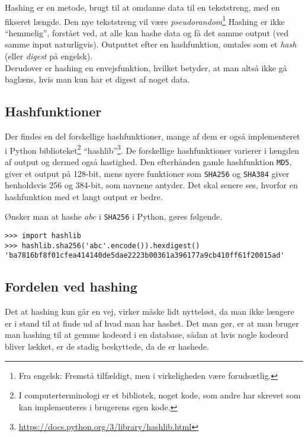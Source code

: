 Hashing er en metode, brugt til at omdanne data til en tekststreng, med en fikseret længde.
Den nye tekststreng vil være \emph{pseudorandom}\footnote{Fra engelsk: Fremstå tilfældigt, men i virkeligheden være forudsætlig.} %
Hashing er ikke ``hemmelig'', forstået ved, at alle kan hashe data og få det samme output (ved samme input naturligvis).
Outputtet efter en hashfunktion, omtales som et \emph{hash} (eller \emph{digest} på engelsk).
\\
Derudover er hashing en envejsfunktion, hvilket betyder, at man altså ikke gå baglæns, hvis man kun har et digest af noget data.\cite{algoritmer}


\subsection{Hashfunktioner}
Der findes en del forskellige hashfunktioner, mange af dem er også implementeret i Python biblioteket\footnote{I computerterminologi er et bibliotek, noget kode, som andre har skrevet som kan implementeres i brugerens egen kode.} ``hashlib''\footnote{\url{https://docs.python.org/3/library/hashlib.html}}.
De forskellige hashfunktioner varierer i længden af output og dermed også hastighed.
Den efterhånden gamle hashfunktion \texttt{MD5}, giver et output på 128-bit, mens nyere funktioner som \texttt{SHA256} og \texttt{SHA384} giver henholdsvis 256 og 384-bit, som navnene antyder.
Det skal senere ses, hvorfor en hashfunktion med et langt output er bedre.

Ønsker man at hashe \(abc\) i \texttt{SHA256} i Python, gøres følgende.
\begin{verbatim}
>>> import hashlib
>>> hashlib.sha256('abc'.encode()).hexdigest()
'ba7816bf8f01cfea414140de5dae2223b00361a396177a9cb410ff61f20015ad'
\end{verbatim}


\subsection{Fordelen ved hashing}
Det at hashing kun går en vej, virker måske lidt nytteløst, da man ikke længere er i stand til at finde ud af hvad man har hashet.
Det man gør, er at man bruger man hashing til at gemme kodeord i en database, sådan at hvis nogle kodeord bliver lækket, er de stadig beskyttede, da de er hashede.\cite{version2}

